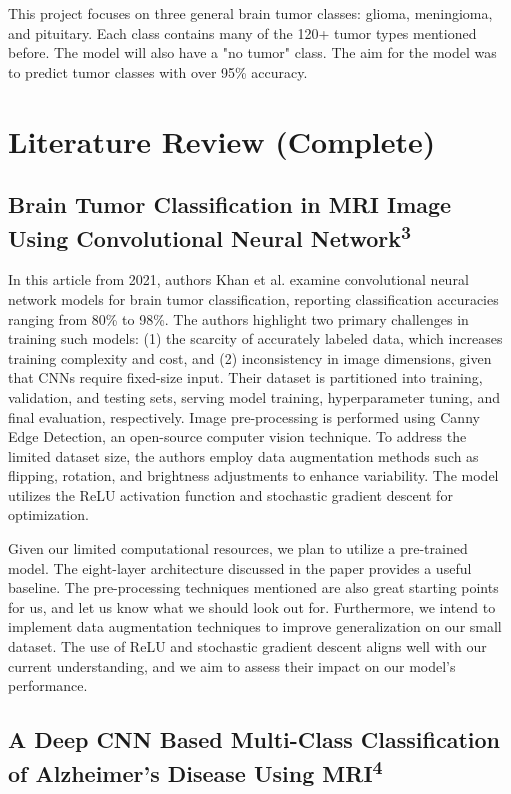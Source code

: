 \documentclass[conference]{IEEEtran}
\begin{document}
This project focuses on three general brain tumor classes: glioma, meningioma, and pituitary. Each class contains many of the 120+ tumor types mentioned before. The model will also have a "no tumor" class. The aim for the model was to predict tumor classes with over 95\% accuracy.

\section{\large Literature Review (Complete)}

\subsection{\large Brain Tumor Classification in MRI Image Using Convolutional Neural Network\textsuperscript{3}}

In this article from 2021, authors Khan et al. examine convolutional neural network models for brain tumor classification, reporting classification accuracies ranging from 80\% to 98\%. The authors highlight two primary challenges in training such models: (1) the scarcity of accurately labeled data, which increases training complexity and cost, and (2) inconsistency in image dimensions, given that CNNs require fixed-size input. Their dataset is partitioned into training, validation, and testing sets, serving model training, hyperparameter tuning, and final evaluation, respectively. Image pre-processing is performed using Canny Edge Detection, an open-source computer vision technique. To address the limited dataset size, the authors employ data augmentation methods such as flipping, rotation, and brightness adjustments to enhance variability. The model utilizes the ReLU activation function and stochastic gradient descent for optimization.

Given our limited computational resources, we plan to utilize a pre-trained model. The eight-layer architecture discussed in the paper provides a useful baseline. The pre-processing techniques mentioned are also great starting points for us, and let us know what we should look out for. Furthermore, we intend to implement data augmentation techniques to improve generalization on our small dataset. The use of ReLU and stochastic gradient descent aligns well with our current understanding, and we aim to assess their impact on our model's performance.

\subsection{\large A Deep CNN Based Multi-Class Classification of Alzheimer's Disease Using MRI\textsuperscript{4}}
\end{document}
